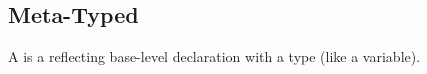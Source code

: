 \subsection{Meta-Typed}
\label{concept-Meta-Typed}

A  is a  reflecting base-level declaration with a type
(like a variable).




